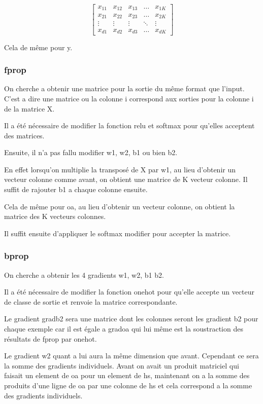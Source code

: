 \documentclass[a4paper,11pt]{article}
\begin{document}
\[
\begin{bmatrix}
    x_{11} & x_{12} & x_{13} & \dots  & x_{1K} \\
    x_{21} & x_{22} & x_{23} & \dots  & x_{2K} \\
    \vdots & \vdots & \vdots & \ddots & \vdots \\
    x_{d1} & x_{d2} & x_{d3} & \dots  & x_{dK}
\end{bmatrix}
\]

Cela de même pour y.

\subsubsection{fprop}

On cherche a obtenir une matrice pour la sortie du même format que l'input. C'est a dire une matrice ou la colonne i correspond aux sorties pour la colonne i de la matrice X.

Il a été nécessaire de modifier la fonction relu et softmax pour qu'elles acceptent des matrices.

Ensuite, il n'a pas fallu modifier w1, w2, b1 ou bien b2.

En effet lorsqu'on multiplie la transposé de X par w1, au lieu d'obtenir un vecteur colonne comme avant, on obtient une matrice de K vecteur colonne. Il suffit de rajouter b1 a chaque colonne ensuite.

Cela de même pour oa, au lieu d'obtenir un vecteur colonne, on obtient la matrice des K vecteurs colonnes.


Il suffit ensuite d'appliquer le softmax modifier pour accepter la matrice.
\subsubsection{bprop}

On cherche a obtenir les 4 gradients  w1, w2, b1 b2.

Il a été nécessaire de modifier la fonction onehot pour qu'elle accepte un vecteur de classe de sortie et renvoie la matrice correspondante.

Le gradient gradb2 sera une matrice dont les colonnes seront les gradient b2 pour chaque exemple car il est égale a gradoa qui lui même est la soustraction des résultats de fprop par onehot.

Le gradient w2 quant a lui aura la même dimension que avant. Cependant ce sera la somme des gradients individuels. Avant on avait un produit matriciel qui faisait un element de oa pour un element de hs, maintenant on a la somme des produits d'une ligne de oa par une colonne de hs et cela correspond a la somme des gradients individuels.
\end{document}
